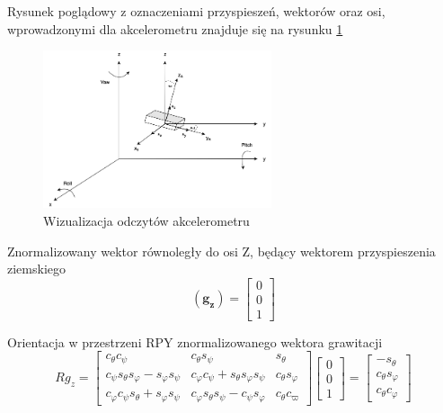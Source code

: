 Rysunek poglądowy z oznaczeniami przyspieszeń, wektorów oraz osi, wprowadzonymi dla akcelerometru znajduje się na rysunku \ref{Akcelerometr oznaczenia}

\begin{figure}[!htb]
    \centering
    \includegraphics[width=0.6\textwidth]{Rysunki/Rozdzial03/Akcelerometr.png}
    \caption{Wizualizacja odczytów akcelerometru}
    \label{Akcelerometr oznaczenia}
\end{figure}

Znormalizowany wektor równoległy do osi Z, będący wektorem przyspieszenia ziemskiego
$$
    \mathbf{(g_z)} =
    \left[
        \begin{array}{c}
            0 \\
            0 \\
            1
        \end{array}
    \right]
$$

Orientacja w przestrzeni RPY znormalizowanego wektora grawitacji
$$
R g_z = 
\left[
    \begin{array}{ccc}
        c_{\theta}c_{\psi} & c_{\theta}s_{\psi} & s_{\theta} \\
        c_{\psi}s_{\theta}s_{\varphi} - s_{\varphi}s_{\psi} & c_{\varphi}c_{\psi} + s_{\theta}s_{\varphi}s_{\psi} & c_{\theta}s_{\varphi} \\
        c_{\varphi}c_{\psi}s_{\theta} + s_{\varphi}s_{\psi} & c_{\varphi}s_{\theta}s_{\psi} - c_{\psi}s_{\varphi} & c_{\theta}c_{\varpi}
    \end{array}
\right]
\left[
    \begin{array}{c}
        0 \\
        0 \\
        1
    \end{array}
\right]
= 
\left[
    \begin{array}{c}
        -s_{\theta} \\
        c_{\theta}s_{\varphi} \\
        c_{\theta}c_{\varphi}
    \end{array}
\right]
$$

